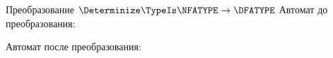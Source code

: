 \begin{frame}{Преобразование $\Determinize\TypeIs\NFATYPE\to\DFATYPE$}
	Автомат до преобразования:


	Автомат после преобразования:%


\end{frame}


